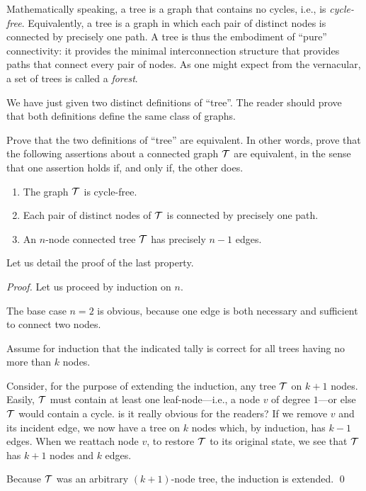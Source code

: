 Mathematically speaking, a tree is a graph that contains no cycles,
i.e., is {\it cycle-free}.  Equivalently, a
tree is a graph in which each pair of distinct nodes is connected by
precisely one path.  A tree is thus the embodiment of ``pure''
connectivity: it provides the minimal interconnection structure that
provides paths that connect every pair of nodes.  As one might expect
from the vernacular, a set of trees is called a {\it forest}. 

We have just given two distinct definitions of ``tree''.  The reader
should prove that both definitions define the same class of graphs.

\begin{prop}
\label{thm:2defns-trees}
Prove that the two definitions of ``tree'' are equivalent.  In other
words, prove that the following assertions about a connected graph
$\mbox{$\cal T$}$ are equivalent, in the sense that one assertion holds if, and
only if, the other does.
\begin{enumerate}
\item
The graph $\mbox{$\cal T$}$ is cycle-free.
\item
Each pair of distinct nodes of $\mbox{$\cal T$}$ is connected by precisely one
path.
\item
An $n$-node connected tree $\mbox{$\cal T$}$ has precisely $n-1$ edges.
\end{enumerate}
\end{prop}

Let us detail the proof of the last property.

\begin{proof}
\noindent 
Let us proceed by induction on $n$.

The base case $n=2$ is obvious, because one edge is both necessary and
sufficient to connect two nodes.

Assume for induction that the indicated tally is correct for all trees
having no more than $k$ nodes.

Consider, for the purpose of extending the induction, any tree $\mbox{$\cal T$}$ on
$k+1$ nodes.  Easily, $\mbox{$\cal T$}$ must contain at least one leaf-node---i.e.,
a node $v$ of degree $1$---or else $\mbox{$\cal T$}$ would contain a cycle.  
{\Denis is it really obvious for the readers?} If we
remove $v$ and its incident edge, we now have a tree on $k$ nodes
which, by induction, has $k-1$ edges.  When we reattach node $v$, to
restore $\mbox{$\cal T$}$ to its original state, we see that $\mbox{$\cal T$}$ has $k+1$ nodes
and $k$ edges.

Because $\mbox{$\cal T$}$ was an arbitrary $(k+1)$-node tree, the induction is
extended.  \qed
\end{proof}

